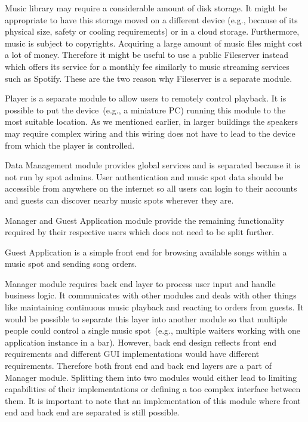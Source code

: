 \par
Music library may require a considerable amount of disk storage. It might be appropriate to have this storage moved on a different device (e.g., because of its physical size, safety or cooling requirements) or in a cloud storage. Furthermore, music is subject to copyrights. Acquiring a large amount of music files might cost a lot of money. Therefore it might be useful to use a public Fileserver instead which offers its service for a monthly fee similarly to music streaming services such as Spotify. These are the two reason why Fileserver is a separate module.
\par
Player is a separate module to allow users to remotely control playback. It is possible to put the device~(e.g., a miniature PC) running this module to the most suitable location. As we mentioned earlier, in larger buildings the speakers may require complex wiring and this wiring does not have to lead to the device from which the player is controlled.
\par
Data Management module provides global services and is separated because it is not run by spot admins. User authentication and music spot data should be accessible from anywhere on the internet so all users can login to their accounts and guests can discover nearby music spots wherever they are.
\par
Manager and Guest Application module provide the remaining functionality required by their respective users which does not need to be split further.
\par
Guest Application is a simple front end for browsing available songs within a music spot and sending song orders.
\par
Manager module requires back end layer to process user input and handle business logic. It communicates with other modules and deals with other things like maintaining continuous music playback and reacting to orders from guests. It would be possible to separate this layer into another module so that multiple people could control a single music spot~(e.g., multiple waiters working with one application instance in a bar). However, back end design reflects front end requirements and different GUI implementations would have different requirements. Therefore both front end and back end layers are a part of Manager module. Splitting them into two modules would either lead to limiting capabilities of their implementations or defining a too complex interface between them. It is important to note that an implementation of this module where front end and back end are separated is still possible.

